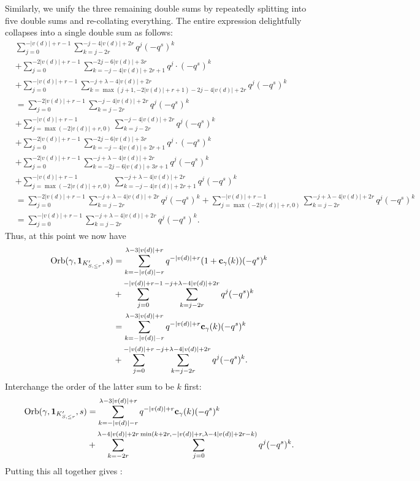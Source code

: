 Similarly, we unify the three remaining double sums by
repeatedly splitting into five double sums and re-collating everything.
The entire expression delightfully collapses into a single double sum as follows:
\begin{align*}
  &\sum_{j=0}^{-|v(d)|+r-1} \sum_{k = j - 2r}^{-j - 4|v(d)| + 2r} q^j (-q^s)^k \\
  &+ \sum_{j=0}^{-2|v(d)|+r-1}
    \sum_{k=-j-4|v(d)|+2r+1}^{-2j-6|v(d)|+3r}
    q^j \cdot (-q^s)^k \\
  &+ \sum_{j=0}^{-|v(d)|+r-1}
    \sum_{k=\max(j+1, -2|v(d)|+r+1) - 2j - 4|v(d)| + 2r}^{-j+\lambda-4|v(d)|+2r}
    q^j (-q^s)^k \\
  &= \sum_{j=0}^{-2|v(d)|+r-1} \sum_{k = j - 2r}^{-j - 4|v(d)| + 2r} q^j (-q^s)^k \\
  &+ \sum_{j=\max(-2|v(d)|+r,0)}^{-|v(d)|+r-1} \sum_{k = j - 2r}^{-j - 4|v(d)| + 2r} q^j (-q^s)^k \\
  &+ \sum_{j=0}^{-2|v(d)|+r-1}
    \sum_{k=-j-4|v(d)|+2r+1}^{-2j-6|v(d)|+3r}
    q^j \cdot (-q^s)^k \\
  &+ \sum_{j=0}^{-2|v(d)|+r-1}
    \sum_{k = -2j - 6|v(d)| + 3r + 1}^{-j+\lambda-4|v(d)|+2r}
    q^j (-q^s)^k \\
  &+ \sum_{j=\max(-2|v(d)|+r, 0)}^{-|v(d)|+r-1}
    \sum_{k = -j - 4|v(d)| + 2r + 1}^{-j+\lambda-4|v(d)|+2r}
    q^j (-q^s)^k \\
  &= \sum_{j=0}^{-2|v(d)|+r-1} \sum_{k = j - 2r}^{-j + \lambda - 4|v(d)| + 2r} q^j (-q^s)^k
    + \sum_{j=\max(-2|v(d)|+r,0)}^{-|v(d)|+r-1} \sum_{k = j - 2r}^{-j + \lambda - 4|v(d)| + 2r} q^j (-q^s)^k \\
  &= \sum_{j=0}^{-|v(d)|+r-1} \sum_{k = j - 2r}^{-j + \lambda - 4|v(d)| + 2r} q^j (-q^s)^k.
\end{align*}
Thus, at this point we now have
\begin{align*}
  \operatorname{Orb}(\gamma, \mathbf{1}_{K'_{S, \le r}}, s)
  &= \sum_{k=-|v(d)|-r}^{\lambda-3|v(d)|+r} q^{-|v(d)|+r} (1+\mathbf c_\gamma(k)) (-q^s)^k \\
  &+ \sum_{j=0}^{-|v(d)|+r-1} \sum_{k = j - 2r}^{-j + \lambda - 4|v(d)| + 2r} q^j (-q^s)^k \\
  &= \sum_{k=-|v(d)|-r}^{\lambda-3|v(d)|+r} q^{-|v(d)|+r} \mathbf c_\gamma(k) (-q^s)^k \\
  &+ \sum_{j=0}^{-|v(d)|+r} \sum_{k = j - 2r}^{-j + \lambda - 4|v(d)| + 2r} q^j (-q^s)^k.
\end{align*}
Interchange the order of the latter sum to be $k$ first:
\begin{align*}
  \operatorname{Orb}(\gamma, \mathbf{1}_{K'_{S, \le r}}, s)
  &= \sum_{k=-|v(d)|-r}^{\lambda-3|v(d)|+r} q^{-|v(d)|+r} \mathbf c_\gamma(k) (-q^s)^k \\
  &+ \sum_{k=-2r}^{\lambda-4|v(d)|+2r} \sum_{j=0}^{\min(k+2r, -|v(d)|+r, \lambda-4|v(d)|+2r-k)} q^j (-q^s)^k.
\end{align*}
Putting this all together gives :
\ellneg*

